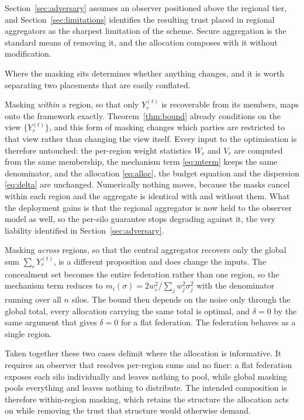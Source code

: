 \documentclass[acmsmall,screen,review,anonymous]{acmart}
\theoremstyle{acmdefinition}%
\begin{document}
Section~\ref{sec:adversary} assumes an observer positioned above the regional
tier, and Section~\ref{sec:limitations} identifies the resulting trust placed in
regional aggregators as the sharpest limitation of the scheme. Secure aggregation
\cite{bonawitz2017secagg} is the standard means of removing it, and the
allocation composes with it without modification.

Where the masking sits determines whether anything changes, and it is worth
separating two placements that are easily conflated.

Masking \emph{within} a region, so that only $Y_r^{(t)}$ is recoverable from its
members, maps onto the framework exactly. Theorem~\ref{thm:bound} already
conditions on the view $\{Y_r^{(t)}\}$, and this form of masking changes which
parties are restricted to that view rather than changing the view itself. Every
input to the optimisation is therefore untouched: the per-region weight statistics
$W_r$ and $V_r$ are computed from the same membership, the mechanism term
\eqref{eq:mterm} keeps the same denominator, and the allocation \eqref{eq:alloc},
the budget equation and the dispersion \eqref{eq:delta} are unchanged. Numerically
nothing moves, because the masks cancel within each region and the aggregate is
identical with and without them. What the deployment gains is that the regional
aggregator is now held to the observer model as well, so the per-silo guarantee
stops degrading against it, the very liability identified in
Section~\ref{sec:adversary}.

Masking \emph{across} regions, so that the central aggregator recovers only the
global sum $\sum_r Y_r^{(t)}$, is a different proposition and does change the
inputs. The concealment set becomes the entire federation rather than one region,
so the mechanism term reduces to $m_i(\sigma) = 2w_i^2 / \sum_{j} w_j^2 \sigma_j^2$
with the denominator running over all $n$ silos. The bound then depends on the
noise only through the global total, every allocation carrying the same total is
optimal, and $\delta = 0$ by the same argument that gives $\delta = 0$ for a flat
federation. The federation behaves as a single region.

Taken together these two cases delimit where the allocation is informative. It
requires an observer that resolves per-region sums and no finer: a flat
federation exposes each silo individually and leaves nothing to pool, while global
masking pools everything and leaves nothing to distribute. The intended
composition is therefore within-region masking, which retains the structure the
allocation acts on while removing the trust that structure would otherwise demand.
\end{document}
